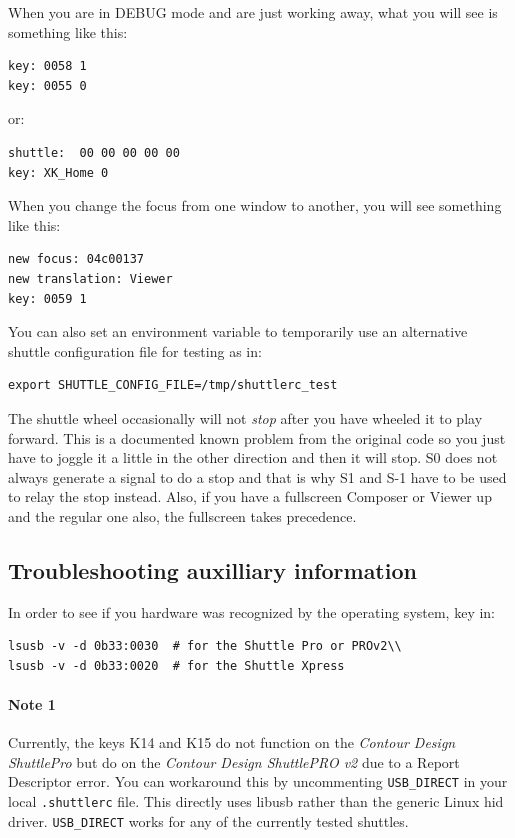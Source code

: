 When you are in DEBUG mode and are just working away, what you will
see is something like this:

\begin{lstlisting}[style=sh]
key: 0058 1
key: 0055 0
\end{lstlisting}

or:

\begin{lstlisting}[style=sh]
shuttle:  00 00 00 00 00
key: XK_Home 0
\end{lstlisting}

When you change the focus from one window to another, you will see
something like this:

\begin{lstlisting}[style=sh]
new focus: 04c00137
new translation: Viewer
key: 0059 1
\end{lstlisting}

You can also set an environment variable to temporarily use an
alternative shuttle configuration file for testing as in:

\begin{lstlisting}[style=sh]
export SHUTTLE_CONFIG_FILE=/tmp/shuttlerc_test
\end{lstlisting}

The shuttle wheel occasionally will not \textit{stop} after you have
wheeled it to play forward.  This is a documented known problem from
the original code so you just have to joggle it a little in the
other direction and then it will stop.  S0 does not always generate
a signal to do a stop and that is why S1 and S-1 have to be used to
relay the stop instead.  Also, if you have a fullscreen Composer or
Viewer up and the regular one also, the fullscreen takes precedence.


\subsection{Troubleshooting auxilliary information}%
\label{sub:troubleshooting_auxilliary_information}

In order to see if you hardware was recognized by the operating
system, key in:

\begin{lstlisting}[style=sh]
lsusb -v -d 0b33:0030  # for the Shuttle Pro or PROv2\\
lsusb -v -d 0b33:0020  # for the Shuttle Xpress
\end{lstlisting}

\paragraph{Note 1} Currently, the keys K14 and K15 do not function
on the \textit{Contour Design ShuttlePro} but do on the
\textit{Contour Design ShuttlePRO v2} due to a Report Descriptor
error.  You can workaround this by uncommenting \texttt{USB\_DIRECT}
in your local \texttt{.shuttlerc} file.  This directly uses libusb
rather than the generic Linux hid driver.  \texttt{USB\_DIRECT}
works for any of the currently tested shuttles.

